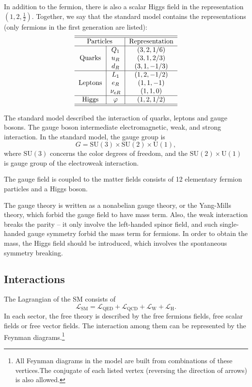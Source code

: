 \documentclass[aps,prb,superscriptaddress,nofootinbib]{revtex4}
\begin{document}
In addition to the fermion, there is also a scalar Higgs field in the representation $\left(1,2,\frac{1}{2}\right)$.
Together, we say that the standard model contains the representations (only fermions in the first generation are listed):
\begin{equation}
\begin{tabular}{c|c|c}
\hline \hline
\multicolumn{2}{c|}{Particles} & Representation\tabularnewline
\hline 
\multirow{3}{*}{Quarks} & $Q_{1}$ & $(3,2,1/6)$\tabularnewline
 & $u_{R}$ & $(3,1,2/3)$\tabularnewline
 & $d_{R}$ & $(3,1,-1/3)$\tabularnewline
\hline 
\multirow{3}{*}{Leptons} & $L_{1}$ & $(1,2,-1/2)$\tabularnewline
 & $e_{R}$ & $(1,1,-1)$\tabularnewline
 & $\nu_{eR}$ & $(1,1,0)$\tabularnewline
\hline 
Higgs & $\varphi$ & $(1,2,1/2)$\tabularnewline
\hline \hline
\end{tabular}
\end{equation}

The standard model described the interaction of quarks, leptons and gauge bosons.
The gauge boson intermediate electromagnetic, weak, and strong interaction.
In the standard model, the gauge group is 
\begin{equation}
	G = \mathrm{SU(3)}\times \mathrm{SU(2)} \times \mathrm{U(1)},
\end{equation}
where $\mathrm{SU(3)}$ concerns the color degrees of freedom, and the $\mathrm{SU(2)}\times \mathrm{U(1)}$ is gauge group of the electroweak interaction.

The gauge field is coupled to the matter fields consists of 12 elementary fermion particles and a Higgs boson.

The gauge theory is written as a nonabelian gauge theory, or the Yang-Mills theory, which forbid the gauge field to have mass term.
Also, the weak interaction breaks the parity -- it only involve the left-handed spinor field, and such single-handed gauge symmetry forbid the mass term for fermions.
In order to obtain the mass, the Higgs field should be introduced, which involves the spontaneous symmetry breaking.


\subsection{Interactions}
The Lagrangian of the SM consists of
\begin{equation}
	\mathcal L_{\mathrm{SM}} = \mathcal L_{\mathrm{QED}} + \mathcal L_{\mathrm{QCD}} + \mathcal L_{\mathrm{W}} + \mathcal L_{\mathrm{H}}.
\end{equation}
In each sector, the free theory is described by the free fermions fields, free scalar fields or free vector fields.
The interaction among them can be represented by the Feynman diagrams.\footnote{All Feynman diagrams in the model are built from combinations of these vertices.The conjugate of each listed vertex (reversing the direction of arrows) is also allowed.}
\end{document}
